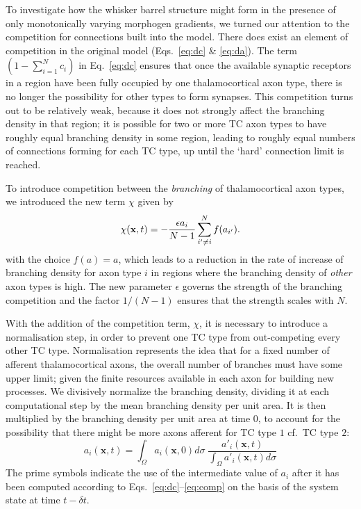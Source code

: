 \documentclass[9pt,twocolumn,twoside,lineno]{pnas-new}
\begin{document}
To investigate how the whisker barrel structure might form in the presence of
only monotonically varying morphogen gradients, we turned our attention to the
competition for connections built into the model. There does exist an element
of competition in the original model (Eqs.~\ref{eq:dc} \& \ref{eq:da}). The
term $\left(1 - \sum_{i=1}^{N} c_i\right)$ in Eq.~\ref{eq:dc} ensures that
once the available synaptic receptors in a region have been fully occupied by
one thalamocortical axon type, there is no longer the possibility for other
types to form synapses. This competition turns out to be relatively weak,
because it does not strongly affect the branching density in that region; it
is possible for two or more TC axon types to have roughly equal branching
density in some region, leading to roughly equal numbers of connections
forming for each TC type, up until the `hard' connection limit is reached.

To introduce competition between the \emph{branching} of thalamocortical axon
types, we introduced the new term $\chi$ given by
%
\begin{equation} \label{eq:comp}
\chi(\mathbf{x}, t) = - \frac{\epsilon  a_i}{N-1} \sum_{i' \ne i}^{N} f(a_{i'}).
\end{equation}
%
with the choice $f(a) = a$, which leads to a reduction in the rate of increase
of branching density for axon type $i$ in regions where the branching density
of \emph{other} axon types is high. The new parameter $\epsilon$ governs the
strength of the branching competition and the factor $1/(N-1)$ ensures that the
strength scales with $N$.

With the addition of the competition term, $\chi$, it is necessary to
introduce a normalisation step, in order to prevent one TC type from
out-competing every other TC type. Normalisation represents the idea that for
a fixed number of afferent thalamocortical axons, the overall number of
branches must have some upper limit; given the finite resources available in
each axon for building new processes. We divisively normalize the branching
density, dividing it at each computational step by the mean branching density
per unit area. It is then multiplied by the branching density per unit area at
time 0, to account for the possibility that there might be more axons afferent
for TC type $1$ cf.~TC type $2$:
%
\begin{equation} \label{eq:norm}
  a_i(\mathbf{x}, t) = \int_\Omega  a_i(\mathbf{x}, 0) d\sigma \; \frac {a'_i(\mathbf{x}, t)} {\int_\Omega
  a'_i(\mathbf{x}, t) d\sigma}
\end{equation}
%
The prime symbols indicate the use of the intermediate value of $a_i$ after it
has been computed according to Eqs.~\ref{eq:dc}--\ref{eq:comp} on the
basis of the system state at time $t-{\delta}t$.
\end{document}
